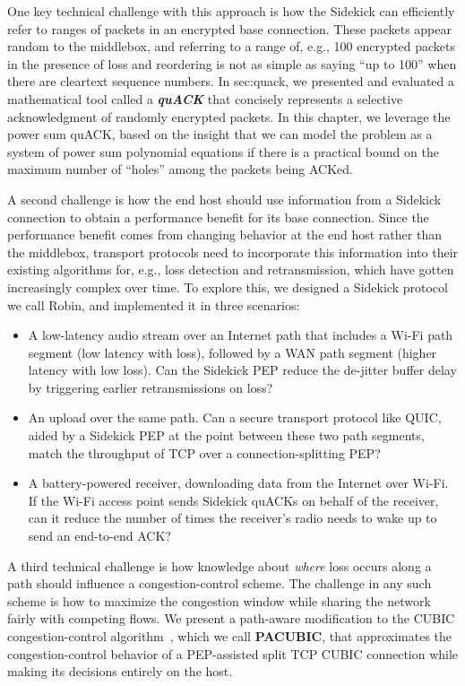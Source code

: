 One key technical challenge with this approach is how the Sidekick can
efficiently refer to ranges of packets in an encrypted base connection. These
packets appear random to the middlebox, and referring to a range of, e.g., 100
encrypted packets in the presence of loss and reordering is not as simple as
saying ``up to 100'' when there are cleartext sequence numbers. In \Cref
{sec:quack}, we presented and evaluated a mathematical tool called a \emph
{\bf quACK} that concisely represents a selective acknowledgment of randomly
encrypted packets. In this chapter, we leverage the power sum quACK,
based on the insight that we can model the problem as a system of power
sum polynomial equations if there is a practical bound on the maximum number of
``holes'' among the packets being ACKed.

A second challenge is how the end host should use information from a Sidekick
connection to obtain a performance benefit for its base connection. Since the
performance benefit comes from changing behavior at the end host rather than
the middlebox, transport protocols need to incorporate this information into
their existing algorithms for, e.g., loss detection and retransmission, which
have gotten increasingly complex over time. To explore this, we designed a
Sidekick protocol we call Robin, and implemented it in three scenarios:
\begin{itemize}[noitemsep,topsep=2pt]
\item A low-latency audio stream over an Internet path that includes a Wi-Fi path segment
  (low latency with loss), followed by a WAN path segment (higher latency
  with low loss). Can the Sidekick PEP reduce the de-jitter buffer delay
  by triggering earlier retransmissions on loss?

\item An upload over the same path. Can a secure transport protocol like QUIC,
  aided by a Sidekick PEP at the point between these two path segments, match
  the throughput of TCP over a connection-splitting PEP?

\item A battery-powered receiver, downloading data from the Internet over Wi-Fi.
  If the Wi-Fi access point sends Sidekick quACKs on behalf of the receiver,
  can it reduce the number of times the receiver's radio needs to wake up
  to send an end-to-end ACK?
\end{itemize}

\smallskip

A third technical challenge is how knowledge about \emph{where}
loss occurs along a path should influence a congestion-control scheme.
The challenge in any such scheme is how to maximize the congestion window
while sharing the network fairly with competing flows.
We present a path-aware modification to the CUBIC congestion-control
algorithm~\cite{ha2008cubic}, which we call \mbox{\textbf{PACUBIC}},
that approximates the congestion-control behavior of a PEP-assisted split TCP
CUBIC connection while making its decisions entirely on the host.

